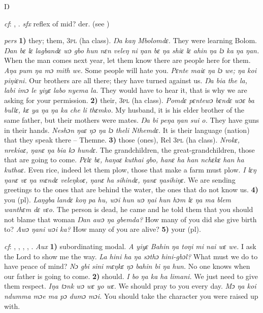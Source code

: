 \begin{letter}{Ŋ}

 \textit{cf}: , . \textit{sfx} reflex of mid? der.  (see )

 \textit{pers} \textbf{1)} they; them, 3\textsc{pl} (ha class). \textit{Ŋa kaŋ Mbolomdɛ.} They were learning Bolom. \textit{Ŋan bɛ lɛ lagbandɛ wɔ gbo hun nɛn veleŋ ni ŋan bɛ ŋa shiɛ lɛ ahin ŋa lɔ ka ŋa ŋan.} When the man comes next year, let them know there are people here for them. \textit{Aŋa pum ŋa mɔ mith we.} Some people will hate you. \textit{Pɛnte maiɛ ŋa lɔ we; ŋa koi piŋiɛni.} Our brothers are all there; they have turned against us. \textit{Ŋa bia the la, labi imɔ le yiyɛ labo nyema la.} They would have to hear it, that is why we are asking for your permission. \textbf{2)} their, 3\textsc{pl} (ha class). \textit{Pomdɛ pɛntewɔ bɛndɛ wɔɛ ba bullɛ, kɛ ya ŋa ŋa ka che li thɛmko.} My husband, it is his elder brother of the same father, but their mothers were mates. \textit{Ŋa bi peŋa ŋan sui o.} They have guns in their hands. \textit{Neshɔn ŋaɛ ŋɔ ŋa lɔ theli Nthemdɛ.} It is their language (nation) that they speak there – Themne. \textbf{3)} those (ones), Rel 3\textsc{pl} (ha class). \textit{Nrokɛ, nrekiaɛ, ŋanɛ ŋa bia kɔ hundɛ.} The grandchildren, the great-grandchildren, those that are going to come. \textit{Pɛlɛ bɛ, haŋaɛ kuthai gbo, hanɛ ha han nchɛkɛ han ha kuthaɛ.} Even rice, indeed let them plow, those that make a farm must plow. \textit{I lɛŋ ŋanɛ vɛ ŋa mɛndɛ veleŋkoɛ, ŋanɛ ha sihindɛ, ŋanɛ ŋasihiŋɛ.} We are sending greetings to the ones that are behind the water, the ones that do not know us. \textbf{4)} you (pl). \textit{Laŋgba landɛ koŋ pa hu, wɔi hun wɔ ŋai hun hɔm lɛ ŋa ma blem wanthɛm dɛ vɛo.} The person is dead, he came and he told them that you should not blame that woman \textit{Ŋan awɔ ŋa gbemda?} How many of you did she give birth to? \textit{Awɔ ŋani wɔi ka?} How many of you are alive? \textbf{5)} your (pl). 

 \textit{cf}: , , , , . \textit{Aux} \textbf{1)} subordinating modal. \textit{A yiyɛ Bahin ŋa toŋi mi nai wɛ we.} I ask the Lord to show me the way. \textit{La hini ha ŋa sɔthɔ hini-gbɔl?} What must we do to have peace of mind? \textit{Nɔ gbi sini mɛŋkɛ ŋɔ bahin bi ŋa hun.} No one knows when our father is going to come. \textbf{2)} should. \textit{I bo ŋa ka ha limani.} We just need to give them respect. \textit{Iŋa tɔnk wɔ wɛ yo wɛ.} We should pray to you every day. \textit{Mɔ ŋa koi ndumma mɔe ma pɔ dumɔ mɔi.} You should take the character you were raised up with.


\end{letter}
